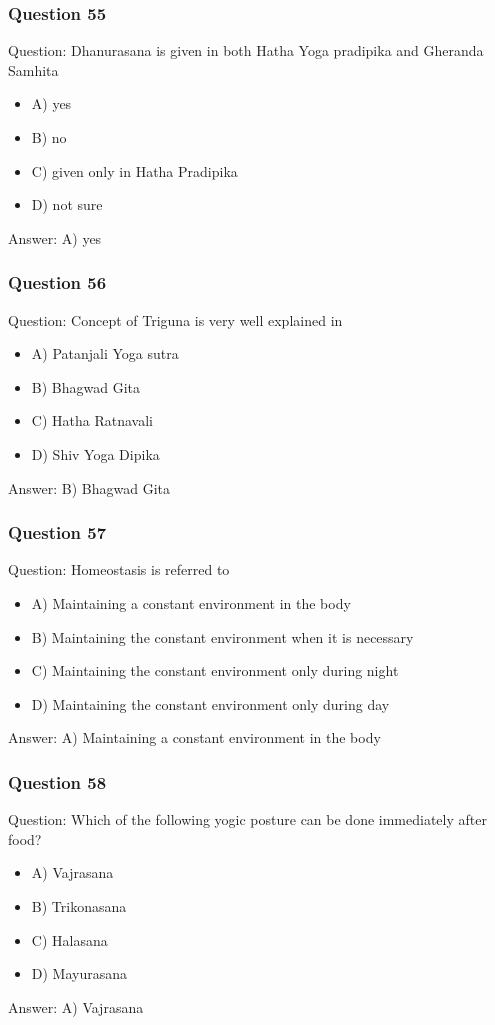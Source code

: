\begin{frame}[fragile]\frametitle{Question 55}
Question: Dhanurasana is given in both Hatha Yoga pradipika and Gheranda Samhita
\begin{itemize}
\item A) yes
\item B) no
\item C) given only in Hatha Pradipika
\item D) not sure
\end{itemize}
Answer: A) yes
\end{frame}

\begin{frame}[fragile]\frametitle{Question 56}
Question: Concept of Triguna is very well explained in
\begin{itemize}
\item A) Patanjali Yoga sutra
\item B) Bhagwad Gita
\item C) Hatha Ratnavali
\item D) Shiv Yoga Dipika
\end{itemize}
Answer: B) Bhagwad Gita
\end{frame}

\begin{frame}[fragile]\frametitle{Question 57}
Question: Homeostasis is referred to
\begin{itemize}
\item A) Maintaining a constant environment in the body
\item B) Maintaining the constant environment when it is necessary
\item C) Maintaining the constant environment only during night
\item D) Maintaining the constant environment only during day
\end{itemize}
Answer: A) Maintaining a constant environment in the body
\end{frame}

\begin{frame}[fragile]\frametitle{Question 58}
Question: Which of the following yogic posture can be done immediately after food?
\begin{itemize}
\item A) Vajrasana
\item B) Trikonasana
\item C) Halasana
\item D) Mayurasana
\end{itemize}
Answer: A) Vajrasana
\end{frame}

